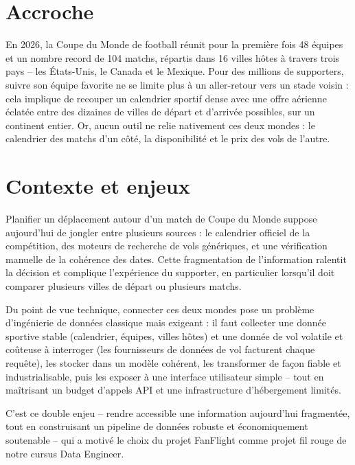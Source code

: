 \documentclass[11pt,a4paper]{report}
\begin{document}
\section*{Accroche}

En 2026, la Coupe du Monde de football réunit pour la première fois 48 équipes et un nombre record de 104 matchs, répartis dans 16 villes hôtes à travers trois pays -- les États-Unis, le Canada et le Mexique. Pour des millions de supporters, suivre son équipe favorite ne se limite plus à un aller-retour vers un stade voisin : cela implique de recouper un calendrier sportif dense avec une offre aérienne éclatée entre des dizaines de villes de départ et d'arrivée possibles, sur un continent entier. Or, aucun outil ne relie nativement ces deux mondes : le calendrier des matchs d'un côté, la disponibilité et le prix des vols de l'autre.

\section*{Contexte et enjeux}

Planifier un déplacement autour d'un match de Coupe du Monde suppose aujourd'hui de jongler entre plusieurs sources : le calendrier officiel de la compétition, des moteurs de recherche de vols génériques, et une vérification manuelle de la cohérence des dates. Cette fragmentation de l'information ralentit la décision et complique l'expérience du supporter, en particulier lorsqu'il doit comparer plusieurs villes de départ ou plusieurs matchs.

Du point de vue technique, connecter ces deux mondes pose un problème d'ingénierie de données classique mais exigeant : il faut collecter une donnée sportive stable (calendrier, équipes, villes hôtes) et une donnée de vol volatile et coûteuse à interroger (les fournisseurs de données de vol facturent chaque requête), les stocker dans un modèle cohérent, les transformer de façon fiable et industrialisable, puis les exposer à une interface utilisateur simple -- tout en maîtrisant un budget d'appels API et une infrastructure d'hébergement limités.

C'est ce double enjeu -- rendre accessible une information aujourd'hui fragmentée, tout en construisant un pipeline de données robuste et économiquement soutenable -- qui a motivé le choix du projet FanFlight comme projet fil rouge de notre cursus Data Engineer.
\end{document}
